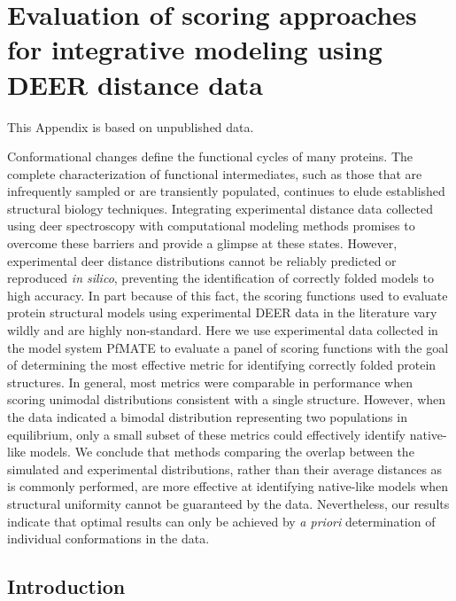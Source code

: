 \clearpage %

\chapter{Evaluation of scoring approaches for integrative modeling using DEER distance data} \label{app:scoring}

This Appendix is based on unpublished data.

\bigskip

Conformational changes define the functional cycles of many proteins. The complete characterization of functional intermediates, such as those that are infrequently sampled or are transiently populated, continues to elude established structural biology techniques. Integrating experimental distance data collected using \gls{deer} spectroscopy with computational modeling methods promises to overcome these barriers and provide a glimpse at these states. However, experimental \gls{deer} distance distributions cannot be reliably predicted or reproduced \emph{in silico}, preventing the identification of correctly folded models to high accuracy. In part because of this fact, the scoring functions used to evaluate protein structural models using experimental DEER data in the literature vary wildly and are highly non-standard. Here we use experimental data collected in the model system PfMATE to evaluate a panel of scoring functions with the goal of determining the most effective metric for identifying correctly folded protein structures. In general, most metrics were comparable in performance when scoring unimodal distributions consistent with a single structure. However, when the data indicated a bimodal distribution representing two populations in equilibrium, only a small subset of these metrics could effectively identify native-like models. We conclude that methods comparing the overlap between the simulated and experimental distributions, rather than their average distances as is commonly performed, are more effective at identifying native-like models when structural uniformity cannot be guaranteed by the data. Nevertheless, our results indicate that optimal results can only be achieved by \emph{a priori} determination of individual conformations in the data.

\section{Introduction}

